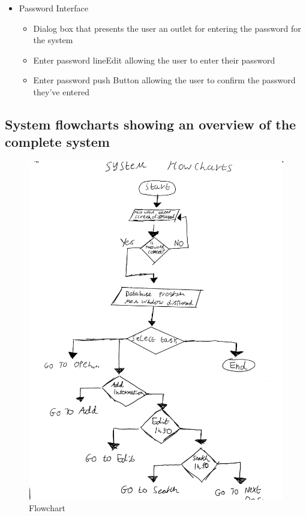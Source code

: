 \begin {itemize}
\begin {itemize}
\begin {itemize}
\begin{itemize}
	    \item A push button allowing the user to confirm they want to print the selected details.
	\end {itemize}
	\item Password Interface
	\begin {itemize}
	    \item Dialog box that presents the user an outlet for entering the password for the system
	    \item Enter password lineEdit allowing the user to enter their password
	    \item Enter password push Button allowing the user to confirm the password they've entered
	\end {itemize}
	\end {itemize}
	\end {itemize}
\end {itemize}

\subsection{System flowcharts showing an overview of the complete system}

\begin{figure}[H]
    \includegraphics[width=\textwidth]{flowchart 5.jpg}
    \caption{Flowchart} \label{fig:Flowchart}
\end{figure}


